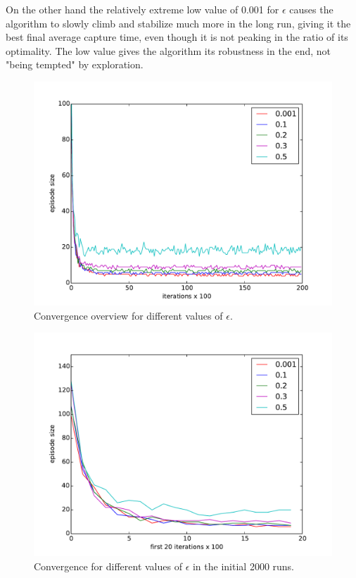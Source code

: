 \documentclass[paper=a4, fontsize=11pt]{scrartcl}
\numberwithin{equation}{section}		%
\numberwithin{figure}{section}			%
\numberwithin{table}{section}				%
\begin{document}
On the other hand the relatively extreme low value of 0.001 for $\epsilon$ causes the algorithm to slowly climb and stabilize much more in the long run, giving it the best final average capture time, even though it is not peaking in the ratio of its optimality. The low value gives the algorithm its robustness in the end, not "being tempted" by exploration.
\begin{figure}[H] \centering
\includegraphics[scale=0.5]{epsilonOverview.pdf}
\caption{Convergence overview for different values of $\epsilon$.} 
\label{figure:epsilonOverview}
\end{figure}
\begin{figure}[H] \centering
\includegraphics[scale=0.5]{epsilonfirst20x100.pdf}
\caption{Convergence for different values of $\epsilon$ in the initial 2000 runs.} 
\label{figure:epsilonfirst20}
\end{figure}
\end{document}
